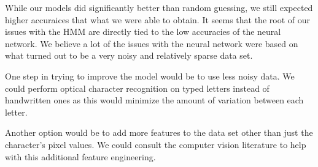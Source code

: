 \documentclass[11pt,a4paper,twocolumn]{article}
\begin{document}
While our models did significantly better than random guessing, we still expected higher accuraices that what we were able to obtain. It seems that the root of our issues with the HMM are directly tied to the low accuracies of the neural network. We believe a lot of the issues with the neural network were based on what turned out to be a very noisy and relatively sparse data set. 

One step in trying to improve the model would be to use less noisy data. We could perform optical character recognition on typed letters instead of handwritten ones as this would minimize the amount of variation between each letter. 

Another option would be to add more features to the data set other than just the character's pixel values. We could consult the computer vision literature to help with this additional feature engineering. 




\end{document}
